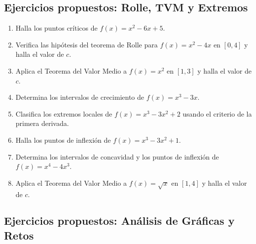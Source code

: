 \documentclass[12pt, letterpaper]{article}
\begin{document}
\subsection{Ejercicios propuestos: Rolle, TVM y Extremos}

\begin{enumerate}[resume=ejercicios, leftmargin=*]
  \item \facil{} Halla los puntos críticos de $f(x) = x^2 - 6x + 5$.

  \item \medio{} Verifica las hipótesis del teorema de Rolle para $f(x) = x^2 - 4x$ en $[0, 4]$ y halla el valor de $c$.

  \item \medio{} Aplica el Teorema del Valor Medio a $f(x) = x^2$ en $[1, 3]$ y halla el valor de $c$.

  \item \medio{} Determina los intervalos de crecimiento de $f(x) = x^3 - 3x$.

  \item \dificil{} Clasifica los extremos locales de $f(x) = x^3 - 3x^2 + 2$ usando el criterio de la primera derivada.

  \item \dificil{} Halla los puntos de inflexión de $f(x) = x^3 - 3x^2 + 1$.

  \item \dificil{} Determina los intervalos de concavidad y los puntos de inflexión de $f(x) = x^4 - 4x^3$.

  \item \muyDificil{} Aplica el Teorema del Valor Medio a $f(x) = \sqrt{x}$ en $[1, 4]$ y halla el valor de $c$.
\end{enumerate}

\subsection{Ejercicios propuestos: Análisis de Gráficas y Retos}
\end{document}
